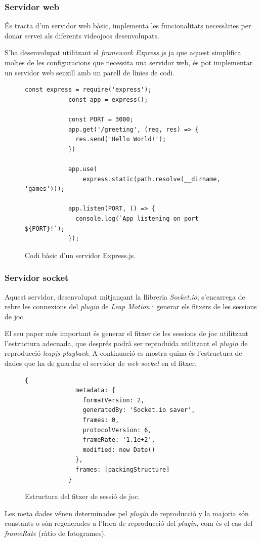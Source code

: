 \documentclass[12pt,a4paper,catalan]{article}
\begin{document}
	\subsubsection{Servidor web}
	És tracta d'un servidor web bàsic, implementa les funcionalitats necessàries per donar servei als diferents videojocs desenvolupats.
	
	S'ha desenvolupat utilitzant el \textit{framework} \textit{Express.js} ja que aquest simplifica moltes de les configuracions que necessita una servidor web, és pot implementar un servidor web senzill amb un parell de línies de codi.
	\begin{figure}[H]
		\begin{lstlisting}[gobble=12, tabsize=4]
			const express = require('express');
			const app = express();
			
			const PORT = 3000;
			app.get('/greeting', (req, res) => {
			  res.send('Hello World!');
			})
			
			app.use(
				express.static(path.resolve(__dirname, 'games')));
			
			app.listen(PORT, () => {
			  console.log(`App listening on port ${PORT}!`);
			});
		\end{lstlisting}
		\caption{Codi bàsic d'un servidor Express.js.}
		\label{fig:express-basic}
	\end{figure}
	\subsubsection{Servidor socket}
	Aquest servidor, desenvolupat mitjançant la llibreria \textit{Socket.io}, s'encarrega de rebre les connexions del \textit{plugin} de \textit{Leap Motion} i generar els fitxers de les sessions de joc.
	
	El seu paper més important és generar el fitxer de les sessions de joc utilitzant l'estructura adecuada, que després podrà ser reproduïda utilitzant el \textit{plugin} de reproducció \textit{leapjs-playback}. A continuació es mostra quina és l'estructura de dades que ha de guardar el servidor de \textit{web socket} en el fitxer.
	\begin{figure}[H]
		\begin{lstlisting}[gobble=12, tabsize=4]
			{
			  metadata: {
			    formatVersion: 2,
			    generatedBy: 'Socket.io saver',
			    frames: 0,
			    protocolVersion: 6,
			    frameRate: '1.1e+2',
			    modified: new Date()
			  },
			  frames: [packingStructure]
			}
		\end{lstlisting}
		\caption{Estructura del fitxer de sessió de joc.}
		\label{fig:recording-structure}
	\end{figure}
	Les meta dades vénen determinades pel \textit{plugin} de reproducció y la majoria són constants o són regenerades a l'hora de reproducció del \textit{plugin}, com és el cas del \textit{frameRate} (ràtio de fotogrames).
	
\end{document}
